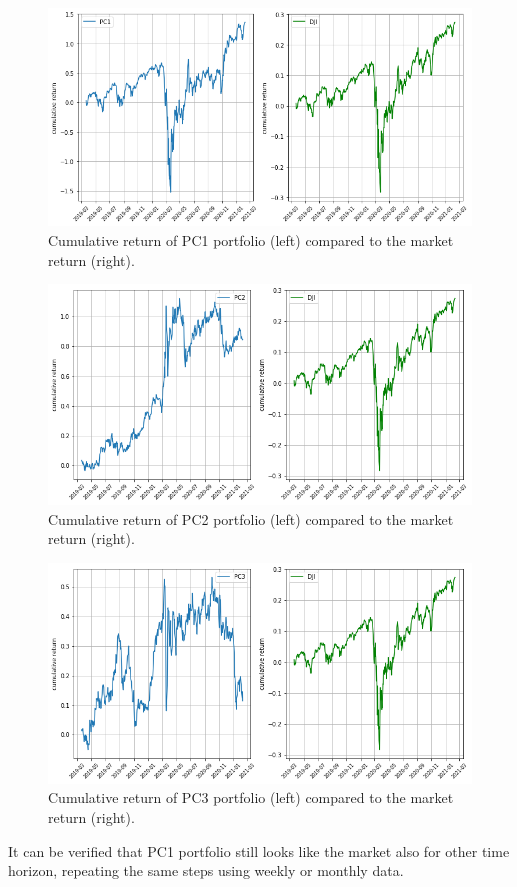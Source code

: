\begin{figure}[tbh]
	\centering
	\includegraphics[width=.7\textwidth]{figures/cum_ret_pc1_vs_market}
	\caption{Cumulative return of PC1 portfolio (left) compared to the market return (right).}
	\label{fig:ret_pc1}
\end{figure}
\begin{figure}[tbh]
	\centering
	\includegraphics[width=.7\textwidth]{figures/cum_ret_pc2_vs_market}
	\caption{Cumulative return of PC2 portfolio (left) compared to the market return (right).}
	\label{fig:ret_pc2}
\end{figure}
\begin{figure}[tbh]
	\centering
	\includegraphics[width=.7\textwidth]{figures/cum_ret_pc3_vs_market}
	\caption{Cumulative return of PC3 portfolio (left) compared to the market return (right).}
	\label{fig:ret_pc3}
\end{figure}

It can be verified that PC1 portfolio still looks like the market also for other time horizon, repeating the same steps using weekly or monthly data.

